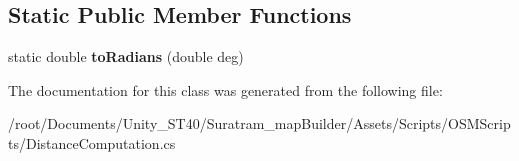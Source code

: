 \subsection*{Static Public Member Functions}
\begin{DoxyCompactItemize}
\item 
\mbox{\label{classHarversine_ac295b111156b25d65fb87bd3ba0090ab}} 
static double {\bfseries to\+Radians} (double deg)
\end{DoxyCompactItemize}


The documentation for this class was generated from the following file\+:\begin{DoxyCompactItemize}
\item 
/root/\+Documents/\+Unity\+\_\+\+S\+T40/\+Suratram\+\_\+map\+Builder/\+Assets/\+Scripts/\+O\+S\+M\+Scripts/Distance\+Computation.\+cs\end{DoxyCompactItemize}
